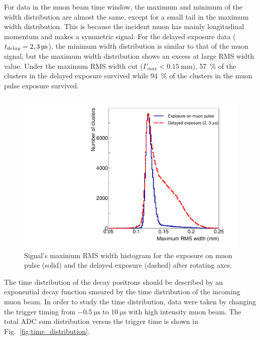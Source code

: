 \documentclass[preprint,3p,twocolumn]{elsarticle}
\begin{document}
For data in the muon beam time window, the maximum and minimum of
the width distribution
are almost the same, except for
a small tail in the maximum width distribution. This is because
the incident muon has mainly longitudinal momentum and makes a
symmetric signal.  
For the delayed exposure data
($t_{delay} = \SIlist[list-pair-separator = {, }, list-units =
single]{2; 3}{\micro\s}$), the minimum width distribution is
similar to that of the muon signal, but the maximum width
distribution shows an excess at large RMS width value. Under the maximum
RMS width cut ($\Gamma_{max} < \SI{0.15}{\mm}$),
\SI{57}{\percent} of the clusters in the delayed exposure
survived while \SI{94}{\percent} of the clusters in the muon
pulse exposure survived.

\begin{figure}[tbp]
	\centering
	\includegraphics[width=\columnwidth]{figure/RMS_legend_v2.pdf}
	\caption{Signal's maximum RMS width histogram for the
          exposure on muon pulse (solid) and the delayed exposure
          (dashed) after rotating axes.}
	\label{fig:positron_width}
\end{figure}

The time distribution of the decay positrons should be described
by an exponential decay function smeared by the time distribution
of the incoming muon beam.  In order to study the time distribution, data
were taken by changing the trigger timing from
$\SI{-0.5}{\micro\s}$ to $\SI{10}{\micro\s}$ with high intensity
muon beam. The total ADC sum distribution versus the trigger time
is shown in Fig.~\ref{fig:time_distribution}.
\end{document}
